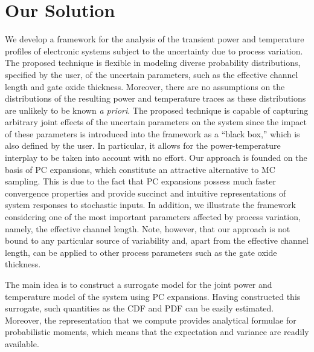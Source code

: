\section{Our Solution}

We develop a framework for the analysis of the transient power and temperature
profiles of electronic systems subject to the uncertainty due to process
variation. The proposed technique is flexible in modeling diverse probability
distributions, specified by the user, of the uncertain parameters, such as the
effective channel length and gate oxide thickness. Moreover, there are no
assumptions on the distributions of the resulting power and temperature traces
as these distributions are unlikely to be known \emph{a priori}. The proposed
technique is capable of capturing arbitrary joint effects of the uncertain
parameters on the system since the impact of these parameters is introduced into
the framework as a ``black box,'' which is also defined by the user. In
particular, it allows for the power-temperature interplay to be taken into
account with no effort. Our approach is founded on the basis of \acf{PC}
expansions, which constitute an attractive alternative to \ac{MC} sampling. This
is due to the fact that \ac{PC} expansions possess much faster convergence
properties and provide succinct and intuitive representations of system
responses to stochastic inputs. In addition, we illustrate the framework
considering one of the most important parameters affected by process variation,
namely, the effective channel length. Note, however, that our approach is not
bound to any particular source of variability and, apart from the effective
channel length, can be applied to other process parameters such as the gate
oxide thickness.

The main idea is to construct a surrogate model for the joint power and
temperature model of the system using \ac{PC} expansions. Having constructed
this surrogate, such quantities as the \acf{CDF} and \acf{PDF} can be easily
estimated. Moreover, the representation that we compute provides analytical
formulae for probabilistic moments, which means that the expectation and
variance are readily available.

